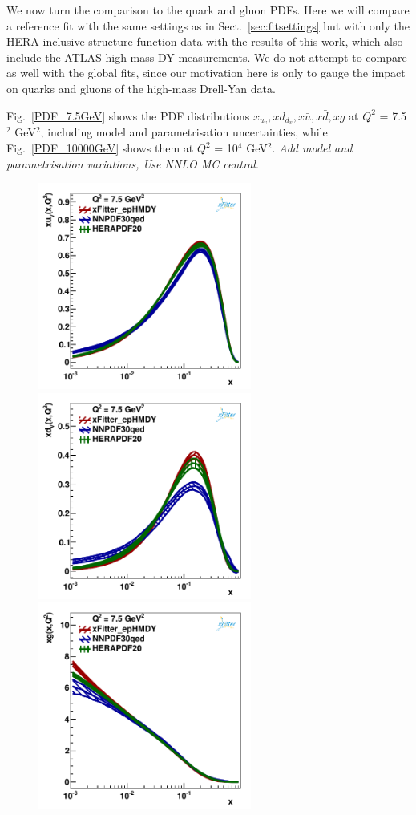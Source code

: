 We now turn the comparison to the quark and gluon PDFs.
%
Here we will compare a reference fit with the same settings as in Sect.~\ref{sec:fitsettings}
but with only the HERA inclusive structure function data with the results of this work,
which also include the ATLAS high-mass DY measurements.
%
We do not attempt to compare as well with the global fits, since our motivation here is only to
gauge the impact on quarks and gluons of the high-mass Drell-Yan data.

Fig.~\ref{PDF_7.5GeV}
 shows the PDF distributions $x_{u_v},xd_{d_v},x\bar{u}, x\bar{d}, xg$ at $Q^{2}$ = 7.5$^{2}$ GeV$^{2}$,
including model and parametrisation uncertainties, while  Fig.~\ref{PDF_10000GeV} 
shows them at $Q^{2}$ = 10$^{4}$ GeV$^{2}$. {\it Add model and parametrisation variations, Use NNLO MC central}.
\begin{figure}
\includegraphics[width=7cm]{plots/uv_7_5.pdf} 
\includegraphics[width=7cm]{plots/dv_7_5.pdf} 
\includegraphics[width=7cm]{plots/gluon_7_5.pdf} 

\end{figure}
